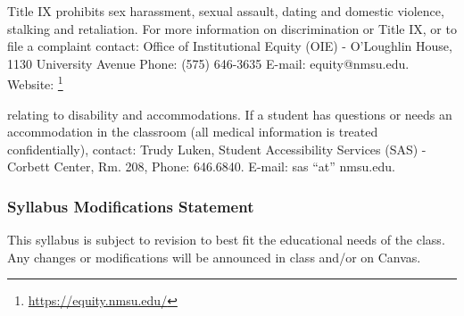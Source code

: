 \documentclass[10pt,letterpaper]{article}
\newcommand{\simplelatexlinkfoot}[2]{\footnote{\href{#2}{#1}}}
\begin{document}
Title IX prohibits sex harassment, sexual assault, dating and domestic violence, stalking and retaliation. For more information on discrimination or Title IX, or to file a complaint contact: Office of Institutional Equity (OIE) - O'Loughlin House, 1130 University Avenue Phone: (575) 646-3635 E-mail: equity@nmsu.edu. Website: \simplelatexlinkfoot{https://equity.nmsu.edu/}{https://equity.nmsu.edu/}



relating to disability and accommodations. If a student has questions or needs an accommodation in the
classroom (all medical information is treated confidentially), contact: Trudy Luken, Student Accessibility Services (SAS) - Corbett Center, Rm. 208, Phone: 646.6840. E-mail: sas ``at'' nmsu.edu.






 
\subsubsection*{Syllabus Modifications Statement}

This syllabus is subject to revision to best fit the educational needs of the class. Any changes or modifications will be announced in class and/or on Canvas.
\end{document}

